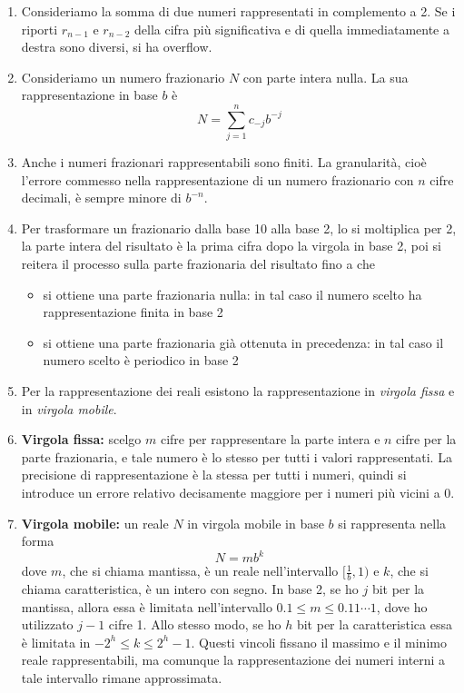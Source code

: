 \documentclass[a4paper,11pt]{article}
\begin{document}
\begin{enumerate}
	\item Consideriamo la somma di due numeri rappresentati in complemento a 2. Se i riporti $r_{n-1}$ e $r_{n-2}$ della cifra più significativa e di quella immediatamente a destra sono diversi, si ha overflow.
	\item Consideriamo un numero frazionario $N$ con parte intera nulla. La sua rappresentazione in base $b$ è
	\[N=\sum_{j=1}^{n}c_{-j}b^{-j}\]
	\item Anche i numeri frazionari rappresentabili sono finiti. La granularità, cioè l'errore commesso nella rappresentazione di un numero frazionario con $n$ cifre decimali, è sempre minore di $b^{-n}$.
	\item Per trasformare un frazionario dalla base 10 alla base 2, lo si moltiplica per 2, la parte intera del risultato è la prima cifra dopo la virgola in base 2, poi si reitera il processo sulla parte frazionaria del risultato fino a che
	\begin{itemize}
		\item si ottiene una parte frazionaria nulla: in tal caso il numero scelto ha rappresentazione finita in base 2
		\item si ottiene una parte frazionaria già ottenuta in precedenza: in tal caso il numero scelto è periodico in base 2
	\end{itemize}
	\item Per la rappresentazione dei reali esistono la rappresentazione in \textit{virgola fissa} e in \textit{virgola mobile}.
	\item \textbf{Virgola fissa:} scelgo $m$ cifre per rappresentare la parte intera e $n$ cifre per la parte frazionaria, e tale numero è lo stesso per tutti i valori rappresentati. La precisione di rappresentazione è la stessa per tutti i numeri, quindi si introduce un errore relativo decisamente maggiore per i numeri più vicini a 0.
	\item\textbf{Virgola mobile:} un reale $N$ in virgola mobile in base $b$ si rappresenta nella forma
	\[N=mb^k\]
	dove $m$, che si chiama mantissa, è un reale nell'intervallo $[\frac{1}{b},1)$ e $k$, che si chiama caratteristica, è un intero con segno. In base 2, se ho $j$ bit per la mantissa, allora essa è limitata nell'intervallo $0.1\leq m\leq0.11\cdots1$, dove ho utilizzato $j-1$ cifre 1. Allo stesso modo, se ho $h$ bit per la caratteristica essa è limitata in $-2^h\leq k\leq2^h-1$. Questi vincoli fissano il massimo e il minimo reale rappresentabili, ma comunque la rappresentazione dei numeri interni a tale intervallo rimane approssimata.

\end{enumerate}
\end{document}
